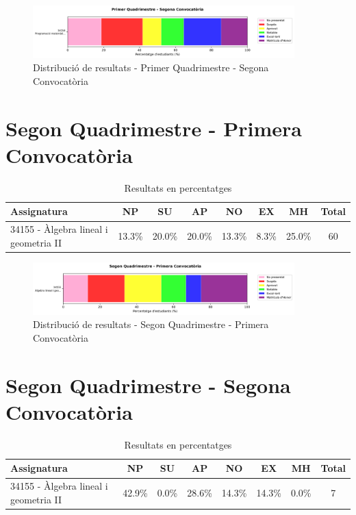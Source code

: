 \documentclass[12pt,a4paper]{article}
\begin{document}
\begin{figure}[H]
\centering
\includegraphics[width=0.9\textwidth]{graficos/barras_1Q2.png}
\caption{Distribució de resultats - Primer Quadrimestre - Segona Convocatòria}
\end{figure}

\clearpage


\section{Segon Quadrimestre - Primera Convocatòria}

\begin{table}[H]
\centering
\small
\begin{tabular}{|p{4cm}|c|c|c|c|c|c|c|}
\hline
\textbf{Assignatura} & \textbf{NP} & \textbf{SU} & \textbf{AP} & \textbf{NO} & \textbf{EX} & \textbf{MH} & \textbf{Total} \\
\hline
34155 - Àlgebra lineal i geometria II & 13.3\% & 20.0\% & 20.0\% & 13.3\% & 8.3\% & 25.0\% & 60 \\
\hline
\end{tabular}
\caption{Resultats en percentatges}
\end{table}


\begin{figure}[H]
\centering
\includegraphics[width=0.9\textwidth]{graficos/barras_2Q1.png}
\caption{Distribució de resultats - Segon Quadrimestre - Primera Convocatòria}
\end{figure}

\clearpage


\section{Segon Quadrimestre - Segona Convocatòria}

\begin{table}[H]
\centering
\small
\begin{tabular}{|p{4cm}|c|c|c|c|c|c|c|}
\hline
\textbf{Assignatura} & \textbf{NP} & \textbf{SU} & \textbf{AP} & \textbf{NO} & \textbf{EX} & \textbf{MH} & \textbf{Total} \\
\hline
34155 - Àlgebra lineal i geometria II & 42.9\% & 0.0\% & 28.6\% & 14.3\% & 14.3\% & 0.0\% & 7 \\
\hline
\end{tabular}
\caption{Resultats en percentatges}
\end{table}
\end{document}

